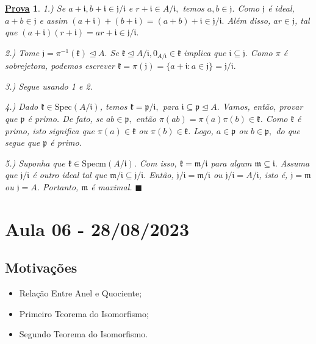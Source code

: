 \documentclass{article}
\newtheorem*{proof*}{\underline{Prova}}
\renewcommand\qedsymbol{$\blacksquare$}
\begin{document}
\begin{proof*}
  1.) Se \(a+\mathfrak{i}, b+\mathfrak{i}\in \mathfrak{j}/\mathfrak{i}\) e \(r+\mathfrak{i}\in A/\mathfrak{i},\) temos
  \(a, b\in \mathfrak{j}.\) Como \(\mathfrak{j}\) é ideal, \(a+b\in \mathfrak{j}\) e assim \((a+\mathfrak{i}) + (b+\mathfrak{i}) = (a+b)
  +\mathfrak{i}\in \mathfrak{j}/\mathfrak{i}.\) Além disso, \(ar\in \mathfrak{j}\), tal que \((a+\mathfrak{i})(r+\mathfrak{i})=ar + \mathfrak{i}\in
  \mathfrak{j}/\mathfrak{i}.\)

  2.) Tome \(\mathfrak{j} = \pi^{-1}(\mathfrak{k})\trianglelefteq{A}.\) Se \(\mathfrak{k}\trianglelefteq{A/\mathfrak{i}}, 0_{A/\mathfrak{i}}\in \mathfrak{k}\)
  implica que \(\mathfrak{i}\subseteq{\mathfrak{j}}.\) Como \(\pi \) é sobrejetora, podemos escrever
  \(\mathfrak{k} = \pi(\mathfrak{j}) = \{a+\mathfrak{i}: a\in \mathfrak{j}\} = \mathfrak{j}/\mathfrak{i}.\)

  3.) Segue usando 1 e 2.

  4.) Dado \(\mathfrak{k}\in \mathrm{Spec}(A/\mathfrak{i})\), temos \(\mathfrak{k} = \mathfrak{p}/\mathfrak{i},\)
  para \(\mathfrak{i}\subseteq{\mathfrak{p}}\trianglelefteq{A}.\) Vamos, então, provar que \(\mathfrak{p}\) é primo. 
  De fato, se \(ab\in \mathfrak{p},\) então \(\pi (ab)=\pi(a)\pi(b)\in \mathfrak{k}\). Como \(\mathfrak{k}\) é primo,
  isto significa que \(\pi(a)\in \mathfrak{k}\) ou \(\pi(b)\in \mathfrak{k}\). Logo, \(a\in \mathfrak{p}\) ou \(b\in \mathfrak{p},\) do que
  segue que \(\mathfrak{p}\) é primo.

  5.) Suponha que \(\mathfrak{k}\in \mathrm{Specm}(A/\mathfrak{i}).\) Com isso, \(\mathfrak{k} = \mathfrak{m}/\mathfrak{i}\)
  para algum \(\mathfrak{m}\subseteq{\mathfrak{i}}.\) Assuma que \(\mathfrak{j}/\mathfrak{i}\) é outro ideal tal que \(\mathfrak{m}/\mathfrak{i}\subseteq{\mathfrak{j}/\mathfrak{i}}.\)
  Então, \(\mathfrak{j}/\mathfrak{i} = \mathfrak{m}/\mathfrak{i}\) ou \(\mathfrak{j}/\mathfrak{i} = A/\mathfrak{i}\), isto é,
  \(\mathfrak{j} = \mathfrak{m}\) ou \(\mathfrak{j} = A\). Portanto, \(\mathfrak{m} \) é maximal. \qedsymbol
\end{proof*}
\newpage

\section{Aula 06 - 28/08/2023}
\subsection{Motivações}
\begin{itemize}
  \item Relação Entre Anel e Quociente;
  \item Primeiro Teorema do Isomorfismo;
  \item Segundo Teorema do Isomorfismo.
\end{itemize}
\end{document}
